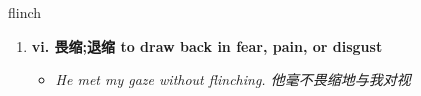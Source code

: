 
\begin{frame}
{\huge flinch}
\begin{center}
\begin{enumerate}\Large
  \item \textbf{vi. 畏缩;退缩 to draw back in fear, pain, or disgust}
  \begin{itemize}
    \item \em{\Large{He met my gaze without flinching. 他毫不畏缩地与我对视}}
  \end{itemize}
\end{enumerate}
\end{center}
\end{frame}
